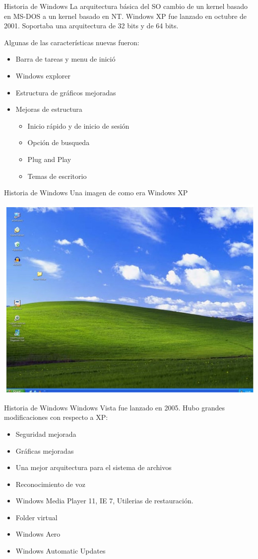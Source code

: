 \documentclass[11pt]{beamer}
\begin{document}
		\begin{frame}{Historia de Windows}
			La arquitectura básica del SO cambio de un kernel basado en MS-DOS a un kernel basado en NT.
			Windows XP fue lanzado en octubre de 2001. Soportaba una arquitectura de 32 bits y de 64 bits.
			
			Algunas de las características nuevas fueron:
			\begin{itemize}
				\item Barra de tareas y menu de inició
				\item Windows explorer
				\item Estructura de gráficos mejoradas
				\item Mejoras de estructura
				\begin{itemize}
					\item Inicio rápido y de inicio de sesión
					\item Opción de busqueda
					\item Plug and Play
					\item Temas de escritorio
				\end{itemize}				
			\end{itemize}
		\end{frame}
		\begin{frame}{Historia de Windows}
			Una imagen de como era Windows XP
			
			\includegraphics[scale=0.5]{wxp.jpg}
		\end{frame}
		\begin{frame}{Historia de Windows}
			Windows Vista fue lanzado en 2005. Hubo grandes modificaciones con respecto a XP:
			\begin{itemize}
				\item Seguridad mejorada
				\item Gráficas mejoradas
				\item Una mejor arquitectura para el sistema de archivos
				\item Reconocimiento de voz
				\item Windows Media Player 11, IE 7, Utilerias de restauración.
				\item Folder virtual
				\item Windows Aero
				\item Windows Automatic Updates
			\end{itemize}
		\end{frame}
\end{document}
